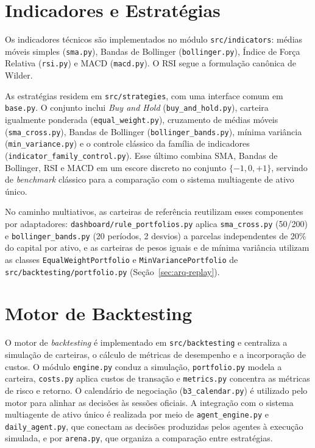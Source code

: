 \documentclass{eic-bcc-tcc}
\begin{document}
\section{Indicadores e Estratégias}

Os indicadores técnicos são implementados no módulo \texttt{src/indicators}: médias móveis simples (\texttt{sma.py}), Bandas de Bollinger (\texttt{bollinger.py}), Índice de Força Relativa (\texttt{rsi.py}) e MACD (\texttt{macd.py}). O RSI segue a formulação canônica de Wilder.

As estratégias residem em \texttt{src/strategies}, com uma interface comum em \texttt{base.py}. O conjunto inclui \textit{Buy and Hold} (\texttt{buy\_and\_hold.py}), carteira igualmente ponderada (\texttt{equal\_weight.py}), cruzamento de médias móveis (\texttt{sma\_cross.py}), Bandas de Bollinger (\texttt{bollinger\_bands.py}), mínima variância (\texttt{min\_variance.py}) e o controle clássico da família de indicadores (\texttt{indicator\_family\_control.py}). Esse último combina SMA, Bandas de Bollinger, RSI e MACD em um escore discreto no conjunto $\{-1, 0, +1\}$, servindo de \textit{benchmark} clássico para a comparação com o sistema multiagente de ativo único.

No caminho multiativos, as carteiras de referência reutilizam esses componentes por adaptadores: \texttt{dashboard/rule\_portfolios.py} aplica \texttt{sma\_cross.py} (50/200) e \texttt{bollinger\_bands.py} (20 períodos, 2 desvios) a parcelas independentes de 20\% do capital por ativo, e as carteiras de pesos iguais e de mínima variância utilizam as classes \texttt{EqualWeightPortfolio} e \texttt{MinVariancePortfolio} de \texttt{src/backtesting/portfolio.py} (Seção~\ref{sec:arq-replay}).

\section{Motor de Backtesting}

O motor de \textit{backtesting} é implementado em \texttt{src/backtesting} e centraliza a simulação de carteiras, o cálculo de métricas de desempenho e a incorporação de custos. O módulo \texttt{engine.py} conduz a simulação, \texttt{portfolio.py} modela a carteira, \texttt{costs.py} aplica custos de transação e \texttt{metrics.py} concentra as métricas de risco e retorno. O calendário de negociação (\texttt{b3\_calendar.py}) é utilizado pelo motor para alinhar as decisões às sessões oficiais. A integração com o sistema multiagente de ativo único é realizada por meio de \texttt{agent\_engine.py} e \texttt{daily\_agent.py}, que conectam as decisões produzidas pelos agentes à execução simulada, e por \texttt{arena.py}, que organiza a comparação entre estratégias.
\end{document}
